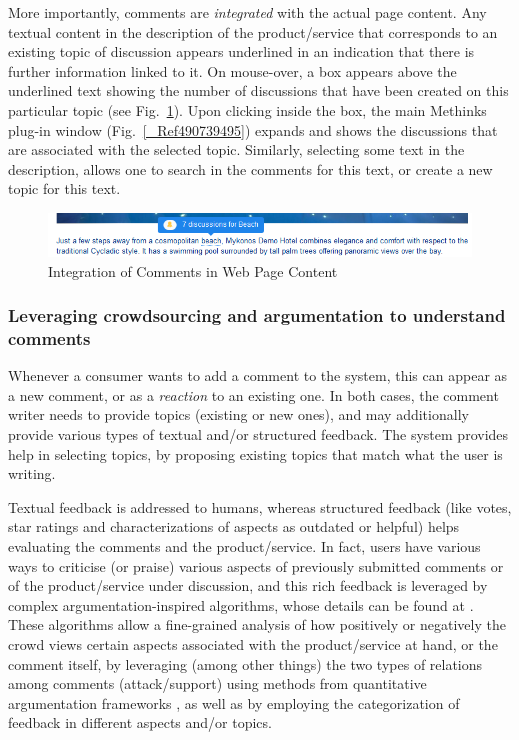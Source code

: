 \documentclass[runningheads,a4paper]{llncs}
\makeatletter
\def\maxwidth#1{\ifdim\Gin@nat@width>#1 #1\else\Gin@nat@width\fi}
\makeatother
\begin{document}
More importantly, comments are {\em integrated} with the actual page content. Any textual content in the description of the product/service that corresponds to an existing topic of discussion appears underlined in an indication that there is further information linked to it. On mouse-over, a box appears above the underlined text showing the number of discussions that have been created on this particular topic (see Fig.~\ref{_Ref490743450}). Upon clicking inside the box, the main Methinks plug-in window (Fig.~\ref{_Ref490739495}) expands and shows the discussions that are associated with the selected topic. Similarly, selecting some text in the description, allows one to search in the comments for this text, or create a new topic for this text.
\begin{figure}[h!]
\centering
\includegraphics[width=\maxwidth{\textwidth}]{./img/image2.png}
\cprotect\caption{ Integration  of Comments in Web Page Content}
\label{_Ref490743450}
\end{figure}


\subsubsection{Leveraging crowdsourcing and argumentation to understand comments}

Whenever a consumer wants to add a comment to the system, this can appear as a new comment, or as a {\em reaction} to an existing one. In both cases, the comment writer needs to provide topics (existing or new ones), and may additionally provide various types of textual and/or structured feedback. The system provides help in selecting topics, by proposing existing topics that match what the user is writing.

Textual feedback is addressed to humans, whereas structured feedback (like votes, star ratings and characterizations of aspects as outdated or helpful) helps evaluating the comments and the product/service. In fact, users have various ways to criticise (or praise) various aspects of previously submitted comments or of the product/service under discussion, and this rich feedback is leveraged by complex argumentation-inspired algorithms, whose details can be found at  \cite{_Ref490741703}. These algorithms allow a fine-grained analysis of how positively or negatively the crowd views certain aspects associated with the product/service at hand, or the comment itself, by leveraging (among other things) the two types of relations among comments (attack/support) using methods from quantitative argumentation frameworks  \cite{_Ref490738141}, as well as by employing the categorization of feedback in different aspects and/or topics.
\end{document}
